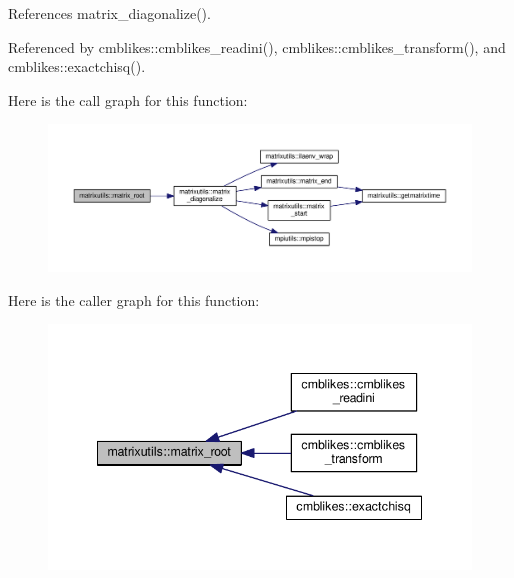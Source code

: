 References matrix\+\_\+diagonalize().



Referenced by cmblikes\+::cmblikes\+\_\+readini(), cmblikes\+::cmblikes\+\_\+transform(), and cmblikes\+::exactchisq().

Here is the call graph for this function\+:
\nopagebreak
\begin{figure}[H]
\begin{center}
\leavevmode
\includegraphics[width=350pt]{namespacematrixutils_a76928f01b83f388ddb51ee3e256cd3a5_cgraph}
\end{center}
\end{figure}
Here is the caller graph for this function\+:
\nopagebreak
\begin{figure}[H]
\begin{center}
\leavevmode
\includegraphics[width=342pt]{namespacematrixutils_a76928f01b83f388ddb51ee3e256cd3a5_icgraph}
\end{center}
\end{figure}
\mbox{\label{namespacematrixutils_a6e5b7eb3ff08d14994be069ca192ea48}} 
